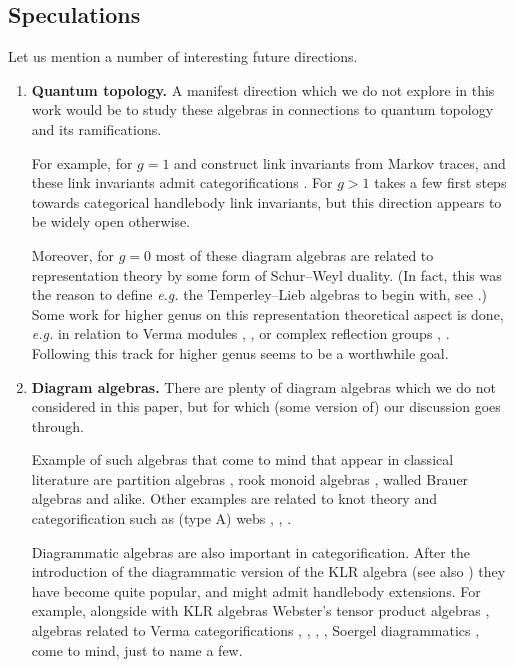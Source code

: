 \documentclass[a4paper,11pt]{amsart}
\newcommand{\eg}{\textsl{e.g.}}
\numberwithin{equation}{section}
\begin{document}
\subsection{Speculations}

Let us mention a number of interesting future directions.

\begin{enumerate}[label=$\bullet$]

\item \textbf{Quantum topology.} 
A manifest direction which we do not explore in 
this work would be to study these algebras 
in connections to quantum topology and its ramifications.

For example, for $g=1$ \cite{Geck-Lambropoulou} and \cite{OrRa-affine-braids}
construct link invariants 
from Markov traces, and
these link invariants admit categorifications \cite{WeWi}. 
For $g>1$ \cite{RoTu-homflypt-typea} takes a few first steps towards 
categorical handlebody link invariants, 
but this direction appears to be widely open otherwise.

Moreover, for $g=0$ most of these diagram algebras are related to 
representation theory by some form of Schur--Weyl duality. 
(In fact, this was the reason to define {\eg} the Temperley--Lieb 
algebras to begin with, see \cite{RuTeWe}.) 
Some work for higher genus on this representation theoretical 
aspect is done, 
{\eg} in relation to Verma modules \cite{IoLeZh-verma-schur-weyl}, 
\cite{LV}, \cite{DaRa-two-boundary-hecke} or complex reflection groups \cite{MaSt}, \cite{SaSh}. Following this track for higher genus
seems to be a worthwhile goal.

\item \textbf{Diagram algebras.} There are plenty 
of diagram algebras which we do not considered in this 
paper, but for which (some version of) our discussion goes through.

Example of such algebras that come to mind that appear in classical 
literature are partition algebras \cite{Martin},
rook monoid algebras \cite{Solomon}, walled 
Brauer algebras \cite{Koike} and alike. 
Other examples are related to knot theory and categorification 
such as (type A) webs \cite{CKM}, \cite{RoTu-symmetric-howe}, 
\cite{TVW}.

Diagrammatic algebras are also important in categorification. 
After the introduction of the diagrammatic version of the 
KLR algebra \cite{KL1} 
(see also \cite{Rouquier}) 
they have become quite popular, and might admit handlebody extensions.
For example, alongside with KLR algebras 
Webster's tensor product algebras \cite{webster}, 
algebras related to Verma categorifications 
\cite{naissevaz2}, \cite{naissevaz3}, \cite{maksimau-vaz}, \cite{lacabanne-naisse-vaz}, Soergel diagrammatics \cite{EW}, 
come to mind, just to name a few. 


\end{enumerate}
\end{document}
